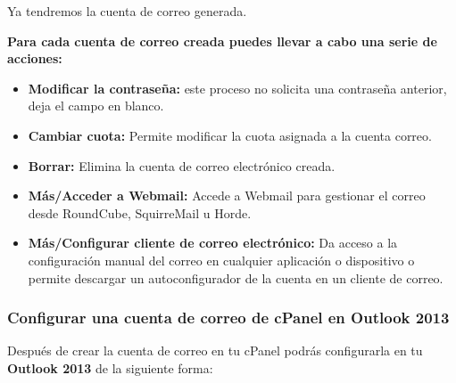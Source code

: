 		Ya tendremos la cuenta de correo generada.
		
		 \newpage
		 
		\textbf{Para cada cuenta de correo creada puedes llevar a cabo una serie de acciones:}
		
		\begin{itemize}
			\item \textbf{Modificar la contraseña:} este proceso no solicita una contraseña anterior, deja el campo en blanco.
			\item \textbf{Cambiar cuota:} Permite modificar la cuota asignada a la cuenta correo.
			\item \textbf{Borrar:} Elimina la cuenta de correo electrónico creada.
			\item \textbf{Más/Acceder a Webmail:} Accede a Webmail para gestionar el correo desde RoundCube, SquirreMail u Horde.
			\item \textbf{Más/Configurar cliente de correo electrónico:} Da acceso a la configuración manual del correo en cualquier aplicación o dispositivo o permite descargar un autoconfigurador de la cuenta en un cliente de correo.
		\end{itemize}
		
		\subsubsection{Configurar una cuenta de correo de cPanel en Outlook 2013}
		
		Después de crear la cuenta de correo en tu cPanel podrás configurarla en tu \textbf{Outlook 2013} de la siguiente forma:
		
